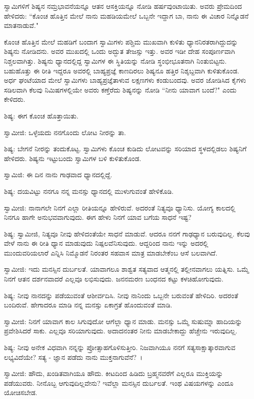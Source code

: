ಸ್ವಾಮಿಗಳಿಗೆ ಶಿಷ್ಯನ ನಮ್ರಭಾವನೆಯನ್ನೂ ಆತನ ಆಸಕ್ತಿಯನ್ನೂ ನೋಡಿ ಹರ್ಷವುಂಟಾಯಿತು. ಅವರು ಪ್ರೇಮದಿಂದ ಹೇಳಿದರು: “ಕೊಂಚ ಹೊತ್ತಿನ ಮೇಲೆ ನಾನು ಮಹಡಿಯಮೇಲೆ ಒಬ್ಬನೇ ಇದ್ದಾಗ ಬಾ, ನಾನು ಈ ವಿಚಾರ ನಿನ್ನೊಡನೆ ಮಾತನಾಡುವೆ."

ಕೊಂಚ ಹೊತ್ತಿನ ಮೇಲೆ ಮಹಡಿಗೆ ಬಂದಾಗ ಸ್ವಾಮಿಗಳು ಪಶ್ಚಿಮ ಮುಖವಾಗಿ ಕುಳಿತು ಧ್ಯಾನನಿರತರಾಗಿದ್ದುದನ್ನು ಶಿಷ್ಯನು ನೋಡಿದನು. ಅವರ ಮುಖದಲ್ಲಿ ಒಂದು ಅದ್ಭುತ ತೇಜಸ್ಸು ಇತ್ತು. ಅವರ ಇಡೀ ದೇಹ ಸಂಪೂರ್ಣವಾಗಿ ನಿಶ್ಚಲವಾಗಿತ್ತು. ಶಿಷ್ಯನು ಧ್ಯಾನದಲ್ಲಿದ್ದ ಸ್ವಾಮಿಗಳ ಈ ಸ್ಥಿತಿಯನ್ನು ನೋಡಿ ಸ್ಥಂಭೀಭೂತನಾಗಿ ನಿಂತುಬಿಟ್ಟನು. ಬಹುಹೊತ್ತು ಈ ರೀತಿ ಇದ್ದರೂ ಅವರಲ್ಲಿ ಬಾಹ್ಯಪ್ರಜ್ಞೆ ಕಾಣದಿರಲು ಶಿಷ್ಯನೂ ಹತ್ತಿರ ನಿಶ್ಶಬ್ದವಾಗಿ ಕುಳಿತುಕೊಂಡ. ಅರ್ಧ ಘಂಟೆಯಾದ ಮೇಲೆ ಸ್ವಾಮಿಗಳು ಬಾಹ್ಯಪ್ರಜ್ಞೆತಾಳುವ ಲಕ್ಷಣಗಳು ಕಂಡುಬಂದವು. ಅವರ ಜೋಡಿಸಿದ ಕೈಗಳು ಸಡಿಲವಾಗಿ ಕೆಲವು ನಿಮಿಷಗಳಲ್ಲಿಯೇ ಅವರು ಕಣ್ತೆರೆದು ಶಿಷ್ಯನನ್ನು ನೋಡಿ “ನೀನು ಯಾವಾಗ ಬಂದೆ?" ಎಂದು ಕೇಳಿದರು.

ಶಿಷ್ಯ: ಈಗ ಕೊಂಚ ಹೊತ್ತಾಯಿತು.

ಸ್ವಾಮೀಜಿ: ಒಳ್ಳೆಯದು ನನಗೊಂದು ಲೋಟ ನೀರನ್ನು ತಾ.

ಶಿಷ್ಯ: ಬೇಗನೆ ನೀರನ್ನು ತಂದುಕೊಟ್ಟ. ಸ್ವಾಮಿಗಳು ಕೊಂಚ ಕುಡಿದು ಲೋಟವನ್ನು ಸರಿಯಾದ ಸ್ಥಳದಲ್ಲಿಡಲು ಶಿಷ್ಯನಿಗೆ ಹೇಳಿದರು. ಶಿಷ್ಯನು ಇಟ್ಟುಬಂದು ಸ್ವಾಮಿಗಳ ಬಳಿ ಕುಳಿತುಕೊಂಡ.

ಸ್ವಾಮಿಜಿ: ಈ ದಿನ ನಾನು ಗಾಢವಾದ ಧ್ಯಾನದಲ್ಲಿದ್ದೆ.

ಶಿಷ್ಯ: ದಯವಿಟ್ಟು ನನಗೂ ನನ್ನ ಮನಸ್ಸು ಧ್ಯಾನದಲ್ಲಿ ಮುಳುಗುವಂತೆ ಹೇಳಿಕೊಡಿ.

ಸ್ವಾಮೀಜಿ: ನಾನಾಗಲೇ ನಿನಗೆ ಎಲ್ಲಾ ರೀತಿಯನ್ನೂ ಹೇಳಿರುವೆ. ಅದರಂತೆ ನಿತ್ಯವೂ ಧ್ಯಾನಿಸು. ಯೋಗ್ಯ ಕಾಲದಲ್ಲಿ ನಿನಗೂ ಹಾಗೇ ಅನುಭವವಾಗುವುದು. ಈಗ ಹೇಳು ನಿನಗೆ ಯಾವ ಬಗೆಯ ಸಾಧನೆ ಇಷ್ಟ?

ಶಿಷ್ಯ: ಸ್ವಾಮೀಜಿ, ನಿತ್ಯವೂ ನೀವು ಹೇಳಿದಂತೆಯೇ ಸಾಧನೆ ಮಾಡುವೆ. ಆದರೂ ನನಗೆ ಗಾಢಧ್ಯಾನ ಬರುವುದಿಲ್ಲ. ಕೆಲವು ವೇಳೆ ನಾನು ಈ ರೀತಿ ಧ್ಯಾನ ಮಾಡುವುದು ನಿಷ್ಪಲವೆನಿಸುವುದು. ಆದ್ದರಿಂದ ನಾನು ಇನ್ನು ಅದರಲ್ಲಿ ಮುಂದುವರಿಯಲಾರೆ ಎನ್ನಿಸಿ ನಿಮ್ಮೊಡನೆ ನಿರಂತರ ಸಹವಾಸ ಮಾತ್ರ ಮಾಡಬೇಕೆಂಬ ಆಸೆ ಬಲವಾಗಿದೆ.

ಸ್ವಾಮೀಜಿ: ಇದು ಮನಸ್ಸಿನ ದುರ್ಬಲತೆ. ಯಾವಾಗಲೂ ಶಾಶ್ವತ ಸತ್ಯವಾದ ಆತ್ಮನಲ್ಲಿ ತಲ್ಲೀನವಾಗಲು ಯತ್ನಿಸು. ಒಮ್ಮೆ ನಿನಗೆ ಆತನ ದರ್ಶನವಾದರೆ ಎಲ್ಲವೂ ಲಭಿಸುವುದು. ಜನನಮರಣ ಬಂಧನದ ಕಟ್ಟು ಕಳಚಿಹೋಗುವುದು.

ಶಿಷ್ಯ: ನೀವು ನಾನದನ್ನು ಪಡೆಯುವಂತೆ ಆಶೀರ್ವದಿಸಿ. ನೀವು ನಾನಿಂದು ಒಬ್ಬನೇ ಬರುವಂತೆ ಹೇಳಿದಿರಿ. ಅದರಂತೆ ಬಂದಿರುವೆ. ಹೇಗಾದರೂ ಮಾಡಿ ನನ್ನ ಮನಸ್ಸು ಏಕಾಗ್ರತೆ ಹೊಂದುವಂತೆ ಮಾಡಿ.

ಸ್ವಾಮೀಜಿ: ನಿನಗೆ ಯಾವಾಗ ಕಾಲ ಸಿಗುವುದೋ ಆಗೆಲ್ಲಾ ಧ್ಯಾನ ಮಾಡು. ಮನಸ್ಸು ಒಮ್ಮೆ ಸುಷುಮ್ನಾ ಹಾದಿಯನ್ನು ಪ್ರವೇಶಿಸಿದರೆ ಸಾಕು. ಎಲ್ಲವೂ ಸರಿಯಾಗುವುದು. ಅದಾದನಂತರ ನೀನು ಮಾಡಬೇಕಾದ್ದು ಹೆಚ್ಚೇನು ಇರುವುದಿಲ್ಲ.

ಶಿಷ್ಯ: ನೀವು ಅನೇಕ ವಿಧವಾಗಿ ನನ್ನನ್ನು ಪ್ರೋತ್ಸಾಹಗೊಳಿಸುತ್ತೀರಿ. ನಿಜವಾಗಿಯೂ ನನಗೆ ಸತ್ಯಸಾಕ್ಷಾತ್ಕಾರವಾಗುವ ಲಭ್ಯವಿದೆಯೇ? ಸತ್ಯ - ಜ್ಞಾನ ಪಡೆದು ನಾನು ಮುಕ್ತನಾಗುವೆನೆ?~।

ಸ್ವಾಮೀಜಿ: ಹೌದು, ಖಂಡಿತವಾಗಿಯೂ ಹೌದು. ಕೀಟದಿಂದ ಹಿಡಿದು ಬ್ರಹ್ಮನವರೆಗೆ ಎಲ್ಲರೂ ಮುಕ್ತಿಯನ್ನು ಪಡೆಯುವರು. ನೀನೊಬ್ಬ ಆಗುವುದಿಲ್ಲವೇನು? ಇವೆಲ್ಲಾ ಮನಸ್ಸಿನ ದುರ್ಬಲತೆ. ಇಂಥ ವಿಷಯಗಳನ್ನು ಎಂದೂ ಯೋಚಿಸಬೇಡ.

